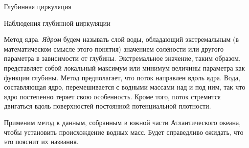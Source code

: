 \begin{chapter}{Глубинная циркуляция}
\begin{section}{Наблюдения глубинной циркуляции}
\begin{paragraph}{Метод ядра.}
\emph{Ядром} будем называть слой воды, обладающий 
экстремальным (в математическом смысле этого понятия) значением солёности
или другого параметра в зависимости от глубины. Экстремальное значение, таким
образом, представляет собой локальный максимум или минимум величины
параметра как функции глубины. Метод предполагает, что поток направлен вдоль
ядра. Вода, составляющая ядро, перемешивается с водными массами над и под ним,
так что ядро постепенно теряет свою особенность. Кроме того, поток стремится
двигаться вдоль поверхностей постоянной потенциальной плотности.
%

Применим метод к данным, собранным в южной части Атлантического океана, чтобы
установить происхождение водных масс. Будет справедливо
ожидать, что это пояснит их названия.
%


\end{paragraph}
\end{section}
\end{chapter}
